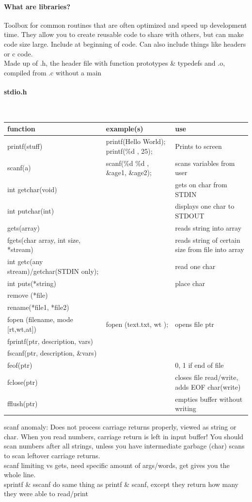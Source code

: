 \documentclass[12 pt]{article}
\begin{document}
\paragraph{What are libraries?} Toolbox for common routines that are often optimized and speed up development time. They allow you to create reusable code to share with others, but can make code size large. Include at beginning of code. Can also include things like headers or c code.
\\ Made up of .h, the header file with function prototypes \& typedefs and .o, compiled from .c without a main
\paragraph{stdio.h}~
\begin{tabularx}{\textwidth}{|X|X|X|}
	\hline \textbf{function} & \textbf{example(s)} & \textbf{use}
	\\\hline printf(\textquotedbl stuff\textquotedbl) & printf(\textquotedbl Hello World\textquotedbl); printf(\textquotedbl \%d \textquotedbl, 25); & Prints to screen
	\\\hline scanf(a) & scanf(\textquotedbl \%d \%d \textquotedbl, \&age1, \&age2); & scans variables from user
	\\\hline int getchar(void) & & gets on char from STDIN
	\\\hline int putchar(int) && displays one char to STDOUT
	\\\hline gets(array) && reads string into array
	\\\hline fgets(char array, int size, *stream) && reads string of certain size from file into array
	\\\hline int getc(any stream)/getchar(STDIN only); && read one char
	\\\hline int puts(*string) && place char
	\\\hline remove (*file) &&
	\\\hline rename(*file1, *file2) &&
	\\\hline fopen (filename, mode [rt,wt,at]) & fopen (text.txt, \textquotedbl wt \textquotedbl); & opens file ptr
	\\\hline fprintf(ptr, description, vars) &&
	\\\hline fscanf(ptr, description, \&vars) &&
	\\\hline feof(ptr) && 0, 1 if end of file
	\\\hline fclose(ptr) && closes file read/write, adds EOF char(write)
	\\\hline fflush(ptr) && empties buffer without writing
	\\\hline
\end{tabularx}
scanf anomaly: Does not process carriage returns properly, viewed as string or char. When you read numbers, carriage return is left in input buffer! You should scan numbers after all strings, unless you have intermediate garbage (char) scans to scan leftover carriage returns.
\\scanf limiting vs gets, need specific amount of args/words, get gives you the whole line.
\\sprintf \& sscanf do same thing as printf \& scanf, except they return how many they were able to read/print
\end{document}
